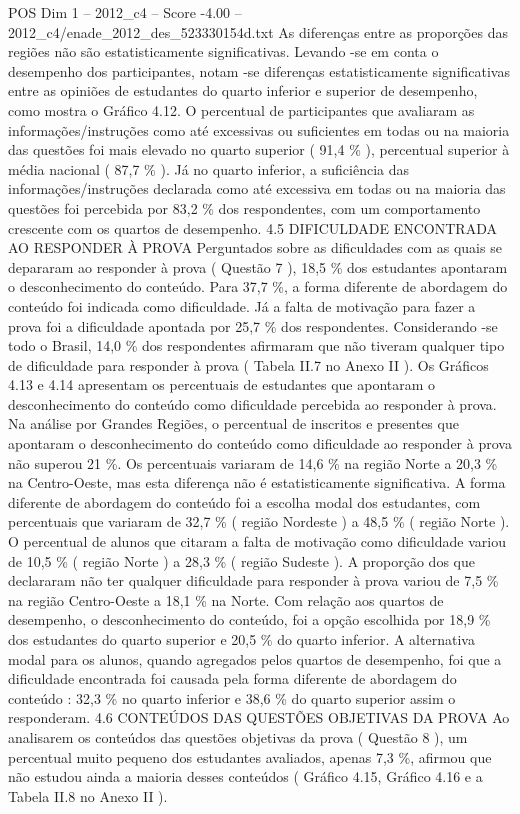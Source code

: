 \begin{textsample}{POS Dim 1 – 2012\_c4 – Score -4.00 – 2012\_c4/enade\_2012\_des\_523330154d.txt}
As diferenças entre as proporções das regiões não são estatisticamente significativas.
Levando -se em conta o desempenho dos participantes, notam -se diferenças estatisticamente significativas entre as opiniões de estudantes do quarto inferior e superior de desempenho, como mostra o Gráfico 4.12.
O percentual de participantes que avaliaram as informações/instruções como até excessivas ou suficientes em todas ou na maioria das questões foi mais elevado no quarto superior ( 91,4 \% ), percentual superior à média nacional ( 87,7 \% ).
Já no quarto inferior, a suficiência das informações/instruções declarada como até excessiva em todas ou na maioria das questões foi percebida por 83,2 \% dos respondentes, com um comportamento crescente com os quartos de desempenho. 4.5 DIFICULDADE ENCONTRADA AO RESPONDER À PROVA Perguntados sobre as dificuldades com as quais se depararam ao responder à prova ( Questão 7 ), 18,5 \% dos estudantes apontaram o desconhecimento do conteúdo.
Para 37,7 \%, a forma diferente de abordagem do conteúdo foi indicada como dificuldade.
Já a falta de motivação para fazer a prova foi a dificuldade apontada por 25,7 \% dos respondentes.
Considerando -se todo o Brasil, 14,0 \% dos respondentes afirmaram que não tiveram qualquer tipo de dificuldade para responder à prova ( Tabela II.7 no Anexo II ).
Os Gráficos 4.13 e 4.14 apresentam os percentuais de estudantes que apontaram o desconhecimento do conteúdo como dificuldade percebida ao responder à prova.
Na análise por Grandes Regiões, o percentual de inscritos e presentes que apontaram o desconhecimento do conteúdo como dificuldade ao responder à prova não superou 21 \%.
Os percentuais variaram de 14,6 \% na região Norte a 20,3 \% na Centro-Oeste, mas esta diferença não é estatisticamente significativa.
A forma diferente de abordagem do conteúdo foi a escolha modal dos estudantes, com percentuais que variaram de 32,7 \% ( região Nordeste ) a 48,5 \% ( região Norte ).
O percentual de alunos que citaram a falta de motivação como dificuldade variou de 10,5 \% ( região Norte ) a 28,3 \% ( região Sudeste ).
A proporção dos que declararam não ter qualquer dificuldade para responder à prova variou de 7,5 \% na região Centro-Oeste a 18,1 \% na Norte.
Com relação aos quartos de desempenho, o desconhecimento do conteúdo, foi a opção escolhida por 18,9 \% dos estudantes do quarto superior e 20,5 \% do quarto inferior.
A alternativa modal para os alunos, quando agregados pelos quartos de desempenho, foi que a dificuldade encontrada foi causada pela forma diferente de abordagem do conteúdo : 32,3 \% no quarto inferior e 38,6 \% do quarto superior assim o responderam. 4.6 CONTEÚDOS DAS QUESTÕES OBJETIVAS DA PROVA Ao analisarem os conteúdos das questões objetivas da prova ( Questão 8 ), um percentual muito pequeno dos estudantes avaliados, apenas 7,3 \%, afirmou que não estudou ainda a maioria desses conteúdos ( Gráfico 4.15, Gráfico 4.16 e a Tabela II.8 no Anexo II ).

\end{textsample}
